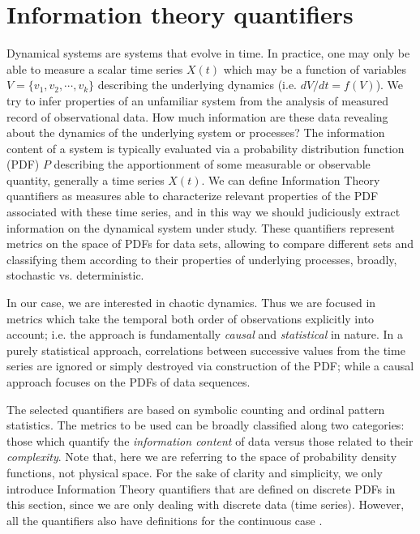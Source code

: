 \section{Information theory quantifiers}\label{sec:quanti}

Dynamical systems are systems that evolve in time.
In practice, one may only be able to measure a scalar time series $X(t)$ which may be a function of variables $V=\{ v_1, v_2,\cdots, v_k\}$ describing the underlying dynamics (i.e. $dV/dt=f(V)$).
We try to infer properties of an unfamiliar system from the analysis of measured record of observational data. 
How much information are these data revealing about the dynamics of the underlying system or processes?
The information content of a system is typically evaluated via a probability distribution function (PDF) $P$ describing the apportionment of some measurable or observable quantity, generally a time series $X(t)$. 
We can define Information Theory quantifiers as measures able to characterize relevant properties of the PDF associated with these time series, and in this way we should judiciously extract information on the dynamical system under study.
These quantifiers represent metrics on the space of PDFs for data sets, allowing to compare different sets and classifying them according to their properties of underlying processes, broadly, stochastic vs. deterministic.

In our case, we are interested in chaotic dynamics.
Thus we are focused in metrics which take the temporal both order of observations explicitly into account; i.e. the approach is fundamentally \textit{causal} and \textit{statistical} in nature.
In a purely statistical approach, correlations between successive values from the time series are ignored or simply destroyed via construction of the PDF; while a causal approach focuses on the PDFs of data sequences.

The selected quantifiers are based on symbolic counting and ordinal pattern statistics.
The metrics to be used can be broadly classified along two categories: those which quantify the \textit{information content} of data versus those related to their \textit{complexity}.
Note that, here we are referring to the space of probability density functions, not physical space.
For the sake of clarity and simplicity, we only introduce Information Theory quantifiers that are defined on discrete PDFs in this section, since we are only dealing with discrete data (time series).
However, all the quantifiers also have definitions for the continuous case \cite{Shannon1948} . 

